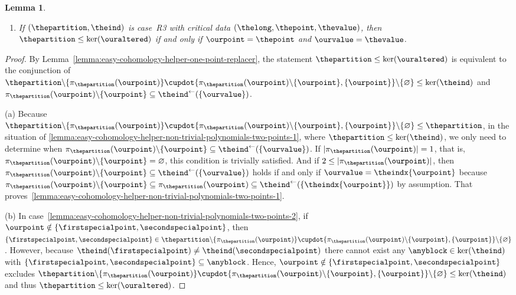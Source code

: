 \documentclass[10pt,a4paper]{amsart}
\numberwithin{equation}{section}
\newtheorem{Lemma}[Theorem]{Lemma}
\newcommand{\spimgx}[2]{#1^{\leftarrow}(#2)}
\newcommand{\finerthan}{\mathrel{\leq}}
\newcommand{\blo}[2]{\pi_{#1}(#2)}
\newcommand{\scenariothree}{R3}
\begin{document}
{\begin{Lemma}
\begin{enumerate}
    \item \label{lemma:easy-cohomology-helper-non-trivial-polynomials-two-points-3}
      If $(\thepartition,\theind)$ is case~\scenariothree{} with critical data $(\thelong,\thepoint,\thevalue)$,
      then $\thepartition\finerthan \ker(\ouraltered)$ if and only if $\ourpoint=\thepoint$ and $\ourvalue=\thevalue$.
    \end{enumerate}
  \end{Lemma}
  \begin{proof}
    By Lem\-ma~\ref{lemma:easy-cohomology-helper-one-point-replacer}, the statement $\thepartition\finerthan \ker(\ouraltered)$ is  equivalent to the conjunction of  $\thepartition\backslash\{\blo{\thepartition}{\ourpoint}\}\cupdot \{\blo{\thepartition}{\ourpoint}\backslash \{\ourpoint\}, \{\ourpoint\}\}\backslash \{\varnothing\}\finerthan\ker(\theind)$ and $\blo{\thepartition}{\ourpoint}\backslash \{\ourpoint\}\subseteq\spimgx{\theind}{\{\ourvalue\}}$.

    (a)
    Because $\thepartition\backslash\{\blo{\thepartition}{\ourpoint}\}\cupdot \{\blo{\thepartition}{\ourpoint}\backslash \{\ourpoint\}, \{\ourpoint\}\}\backslash \{\varnothing\}\finerthan\thepartition$, in the situation of \ref{lemma:easy-cohomology-helper-non-trivial-polynomials-two-points-1}, where $\thepartition\finerthan\ker(\theind)$, we only need to determine when $\blo{\thepartition}{\ourpoint}\backslash \{\ourpoint\}\subseteq\spimgx{\theind}{\{\ourvalue\}}$. If $|\blo{\thepartition}{\ourpoint}|=1$, that is, $\blo{\thepartition}{\ourpoint}\backslash \{\ourpoint\}=\varnothing$, this condition is trivially satisfied. And if $2\leq |\blo{\thepartition}{\ourpoint}|$, then $\blo{\thepartition}{\ourpoint}\backslash \{\ourpoint\}\subseteq\spimgx{\theind}{\{\ourvalue\}}$ holds if and only if $\ourvalue=\theindx{\ourpoint}$  because $\blo{\thepartition}{\ourpoint}\backslash \{\ourpoint\}\subseteq\blo{\thepartition}{\ourpoint}\subseteq \spimgx{\theind}{ \{\theindx{\ourpoint}\}}$ by assumption. That proves~\ref{lemma:easy-cohomology-helper-non-trivial-polynomials-two-points-1}.

    (b)
    In case~\ref{lemma:easy-cohomology-helper-non-trivial-polynomials-two-points-2}, if  $\ourpoint\notin\{\firstspecialpoint,\secondspecialpoint\}$, then $\{\firstspecialpoint,\secondspecialpoint\}\in \thepartition\backslash\{\blo{\thepartition}{\ourpoint}\}\cupdot \{\blo{\thepartition}{\ourpoint}\backslash \{\ourpoint\}, \{\ourpoint\}\}\backslash \{\varnothing\}$. However, because $\theind(\firstspecialpoint)\neq \theind(\secondspecialpoint)$ there cannot exist any $\anyblock\in\ker(\theind)$ with $\{\firstspecialpoint,\secondspecialpoint\}\subseteq \anyblock$. Hence, $\ourpoint\notin\{\firstspecialpoint,\secondspecialpoint\}$ excludes  $\thepartition\backslash\{\blo{\thepartition}{\ourpoint}\}\cupdot \{\blo{\thepartition}{\ourpoint}\backslash \{\ourpoint\}, \{\ourpoint\}\}\backslash \{\varnothing\}\finerthan\ker(\theind)$ and thus  $\thepartition\finerthan \ker(\ouraltered)$.


\end{proof}}
\end{document}
